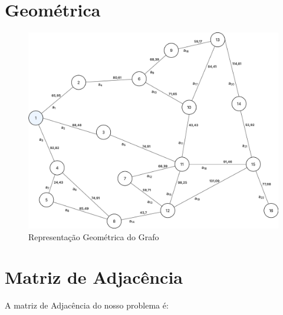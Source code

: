\documentclass[
12pt,
a4paper,
semrecuonosumario,
sumario = abnt-6027-2012]{report}
\begin{document}
	\section{Geométrica}\label{sec:geometrica}
	\begin{figure}[!htb]%
	\caption{Representação Geométrica do Grafo}%
		\label{fig:grafGeometrico}%
		\includegraphics[width=1\textwidth,angle=0]{figuras/grafoGeometrico.png}%
	\end{figure}
	
	
	\section{Matriz de Adjacência}\label{sec:matriz}
	
	A matriz de Adjacência do nosso problema é:
	
\end{document}
